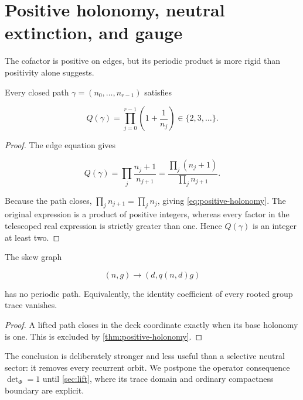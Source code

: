 \section{Positive holonomy, neutral extinction, and gauge}
\label{sec:holonomy}

The cofactor is positive on edges, but its periodic product is more rigid
than positivity alone suggests.

\begin{theorem}
\label{thm:positive-holonomy}
Every closed path \(\gamma=(n_0,\ldots,n_{r-1})\) satisfies

\begin{equation}
 Q(\gamma)=
 \prod_{j=0}^{r-1}\left(1+\frac1{n_j}\right)
 \in\{2,3,\ldots\}.
\label{eq:positive-holonomy}
\end{equation}
\end{theorem}

\begin{proof}
The edge equation gives

\[
 Q(\gamma)
 =\prod_j\frac{n_j+1}{n_{j+1}}
 =\frac{\prod_j(n_j+1)}{\prod_jn_{j+1}}.
\]

Because the path closes, \(\prod_jn_{j+1}=\prod_jn_j\), giving
\cref{eq:positive-holonomy}.  The original expression is a product of
positive integers, whereas every factor in the telescoped real expression is
strictly greater than one.  Hence \(Q(\gamma)\) is an integer at least two.
\end{proof}

\begin{corollary}
\label{cor:no-neutral}
The skew graph

\[
 (n,g)\longrightarrow(d,q(n,d)g)
\]

has no periodic path.  Equivalently, the identity coefficient of every
rooted group trace vanishes.
\end{corollary}

\begin{proof}
A lifted path closes in the deck coordinate exactly when its base holonomy is
one.  This is excluded by \cref{thm:positive-holonomy}.
\end{proof}

The conclusion is deliberately stronger and less useful than a selective
neutral sector: it removes every recurrent orbit.  We postpone the operator
consequence \(\det_\Phi=1\) until \cref{sec:lift}, where its trace domain and
ordinary compactness boundary are explicit.

